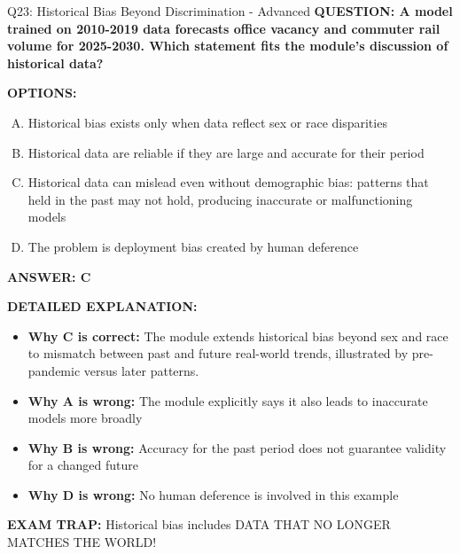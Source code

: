 \documentclass[8pt]{beamer}
\begin{document}
\begin{frame}[shrink=6]{Q23: Historical Bias Beyond Discrimination - Advanced}
\fontsize{6.5}{7.5}\selectfont
\textbf{QUESTION: A model trained on 2010-2019 data forecasts office vacancy and commuter rail volume for 2025-2030. Which statement fits the module's discussion of historical data?}

\vspace{0.1cm}
\textbf{OPTIONS:}
\begin{enumerate}[A.]
\item Historical bias exists only when data reflect sex or race disparities
\item Historical data are reliable if they are large and accurate for their period
\item Historical data can mislead even without demographic bias: patterns that held in the past may not hold, producing inaccurate or malfunctioning models
\item The problem is deployment bias created by human deference
\end{enumerate}

\vspace{0.1cm}
\textcolor{myblue}{\textbf{ANSWER: C}}

\vspace{0.1cm}
\textbf{DETAILED EXPLANATION:}
\begin{itemize}
\item \textbf{Why C is correct:} The module extends historical bias beyond sex and race to mismatch between past and future real-world trends, illustrated by pre-pandemic versus later patterns.
\item \textbf{Why A is wrong:} The module explicitly says it also leads to inaccurate models more broadly
\item \textbf{Why B is wrong:} Accuracy for the past period does not guarantee validity for a changed future
\item \textbf{Why D is wrong:} No human deference is involved in this example
\end{itemize}

\textcolor{myred}{\textbf{EXAM TRAP:}} Historical bias includes DATA THAT NO LONGER MATCHES THE WORLD!
\end{frame}
\end{document}
